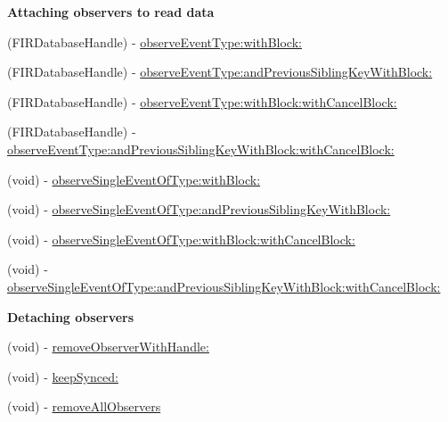 \begin{Indent}{\bf Attaching observers to read data}\par
\begin{DoxyCompactItemize}
\item 
(F\+I\+R\+Database\+Handle) -\/ \hyperlink{interface_f_i_r_database_reference_a92d618b443c649ba9f8c9d938a478c99}{observe\+Event\+Type\+:with\+Block\+:}
\item 
(F\+I\+R\+Database\+Handle) -\/ \hyperlink{interface_f_i_r_database_reference_ab397f0954c585301aac6e1454508cecd}{observe\+Event\+Type\+:and\+Previous\+Sibling\+Key\+With\+Block\+:}
\item 
(F\+I\+R\+Database\+Handle) -\/ \hyperlink{interface_f_i_r_database_reference_a45302c74ef8e2646a30654288529cdc4}{observe\+Event\+Type\+:with\+Block\+:with\+Cancel\+Block\+:}
\item 
(F\+I\+R\+Database\+Handle) -\/ \hyperlink{interface_f_i_r_database_reference_aae2652117463c93b3d7cb887637bac05}{observe\+Event\+Type\+:and\+Previous\+Sibling\+Key\+With\+Block\+:with\+Cancel\+Block\+:}
\item 
(void) -\/ \hyperlink{interface_f_i_r_database_reference_a514e9d816232fb3e49e003f858282911}{observe\+Single\+Event\+Of\+Type\+:with\+Block\+:}
\item 
(void) -\/ \hyperlink{interface_f_i_r_database_reference_adc5a74af8ee95772dd5952860f53510e}{observe\+Single\+Event\+Of\+Type\+:and\+Previous\+Sibling\+Key\+With\+Block\+:}
\item 
(void) -\/ \hyperlink{interface_f_i_r_database_reference_a2c96e31b4abab73ceed369a04ed6d976}{observe\+Single\+Event\+Of\+Type\+:with\+Block\+:with\+Cancel\+Block\+:}
\item 
(void) -\/ \hyperlink{interface_f_i_r_database_reference_ac26f783cb6ec5b0f2c30032ef5624f62}{observe\+Single\+Event\+Of\+Type\+:and\+Previous\+Sibling\+Key\+With\+Block\+:with\+Cancel\+Block\+:}
\end{DoxyCompactItemize}
\end{Indent}
\begin{Indent}{\bf Detaching observers}\par
\begin{DoxyCompactItemize}
\item 
(void) -\/ \hyperlink{interface_f_i_r_database_reference_a3550fc030f427ed4a63996f2227af624}{remove\+Observer\+With\+Handle\+:}
\item 
(void) -\/ \hyperlink{interface_f_i_r_database_reference_aecf6c7ddf5d232b8ec00b00ebbffe78c}{keep\+Synced\+:}
\item 
(void) -\/ \hyperlink{interface_f_i_r_database_reference_af462cc690a2cd87354fdfb9a83fb38a8}{remove\+All\+Observers}
\end{DoxyCompactItemize}
\end{Indent}
